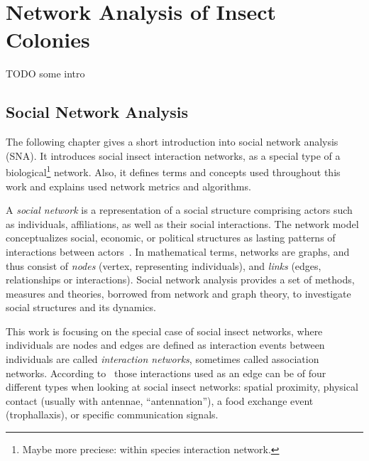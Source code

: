 \chapter{Network Analysis of Insect Colonies}

TODO some intro
\section{Social Network Analysis}
\label{ch:bg}
The following chapter gives a short introduction into social network analysis (SNA). It introduces social insect interaction networks, as a special type of a biological\footnote{Maybe more preciese: within species interaction network.} network. Also, it defines terms and concepts used throughout this work and explains used network metrics and algorithms.

A \emph{social network} is a representation of a social structure comprising actors such as individuals, affiliations, as well as their social interactions.
The network model conceptualizes social, economic, or political structures as lasting patterns of interactions between actors~\cite{wasserman1994social}.
In mathematical terms, networks are graphs, and thus consist of \emph{nodes} (vertex, representing individuals), and \emph{links} (edges, relationships or interactions).
Social network analysis provides a set of methods, measures and theories, borrowed from network and graph theory, to investigate social structures and its dynamics.

This work is focusing on the special case of social insect networks, where individuals are nodes and edges are defined as interaction events between individuals are called \emph{interaction networks}, sometimes called association networks.
According to~\textcite{charbonneau2013social} those interactions used as an edge can be of four different types when looking at social insect networks: spatial proximity, physical contact (usually with antennae, “antennation”), a food exchange event (trophallaxis), or specific communication signals.

